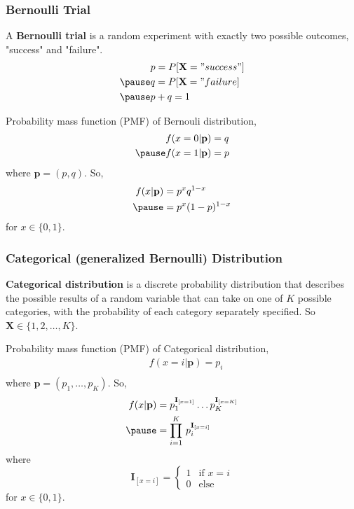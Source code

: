\documentclass[12pt,aspectratio=169]{beamer}
\begin{document}
\begin{frame}
\frametitle{Bernoulli Trial}
A \textbf{Bernoulli trial} is a random experiment with exactly two possible outcomes, "success" and "failure". \pause
\[
\begin{aligned}
&p=P[\mathbf{X}="success"]\\ \pause
&q=P[\mathbf{X}="failure]\\ \pause
&p+q=1
\end{aligned}
\]
\end{frame}

\begin{frame}
Probability mass function (PMF) of Bernouli distribution,\pause
\[
\begin{aligned}
&f(x=0|\mathbf{p})=q\\ \pause
&f(x=1|\mathbf{p})=p
\end{aligned}
\] \pause
where $\mathbf{p}=(p,q)$. So,\pause
\[
\begin{aligned}
f(x|\mathbf{p})&=p^xq^{1-x}\\ \pause
&=p^x(1-p)^{1-x}
\end{aligned}
\]\pause
for $x\in \{0,1\}$.
\end{frame}




\begin{frame}
\frametitle{Categorical (generalized Bernoulli) Distribution}
\textbf{Categorical distribution} is a discrete probability distribution that describes the possible results of a random variable that can take on one of $K$ possible categories, with the probability of each category separately specified. So $\mathbf{X}\in\{1,2,\dots,K\}$.
\end{frame}


\begin{frame}
Probability mass function (PMF) of Categorical distribution,\pause
\[
\begin{aligned}
&f(x=i|\mathbf{p})=p_i\\
\end{aligned}
\] \pause
where $\mathbf{p}=(p_1,\dots,p_K)$. So,\pause
\[
\begin{aligned}
f(x|\mathbf{p})&=p_1^{\mathbf{I}_{[x=1]}}\dots p_K^{\mathbf{I}_{[x=K]}} \\ \pause
&=\prod_{i=1}^K\,p_i^{\mathbf{I}_{[x=i]}}
\end{aligned}
\]\pause
where
\[
\mathbf{I}_{[x=i]}=
\left\{ \begin{array}{cc}
1 & \mbox{if $x=i$}\\
0 & \mbox{else}
\end{array} \right.
\]
for $x\in \{0,1\}$.
\end{frame}
\end{document}
